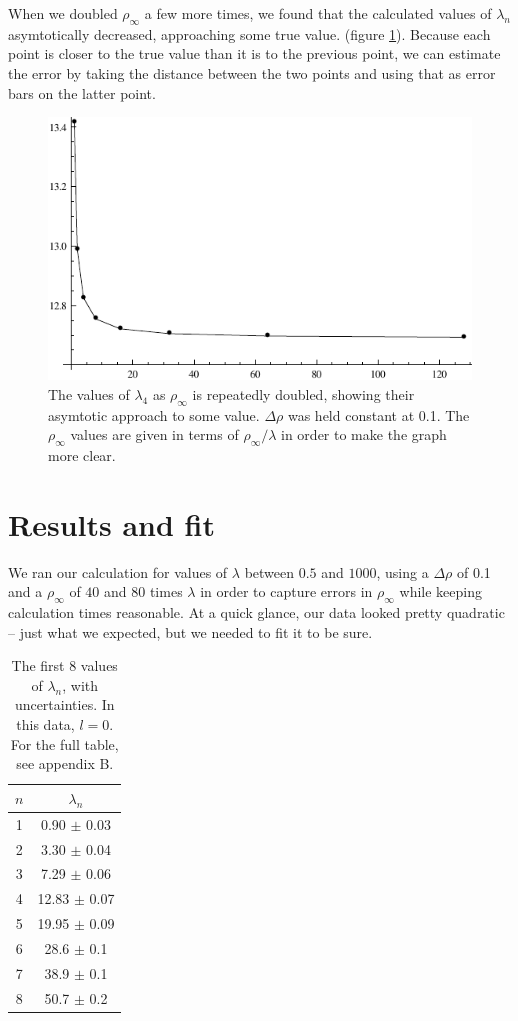 \documentclass[12pt,twoside]{reedthesis}
\begin{document}
When we doubled $\rho_{\infty}$ a few more times, we found that the calculated values of $\lambda_{n}$ asymtotically decreased, approaching some true value. (figure \ref{fig:asymtote}). Because each point is closer to the true value than it is to the previous point, we can estimate the error by taking the distance between the two points and using that as error bars on the latter point.

\begin{figure}[h]
\centering
\includegraphics{Figures/asymtote}
\caption[Asymtotic behavior of $\lambda_{4} (\rho_{\infty})$]{The values of $\lambda_{4}$ as $\rho_{\infty}$ is repeatedly doubled, showing their asymtotic approach to some value. $\Delta \rho$ was held constant at 0.1. The $\rho_{\infty}$ values are given in terms of $\rho_{\infty}/\lambda$ in order to make the graph more clear.}
\label{fig:asymtote}
\end{figure} 

\section{Results and fit}
We ran our calculation for values of $\lambda$ between $0.5$ and $1000$, using a $\Delta \rho$ of 0.1 and a $\rho_{\infty}$ of $40$ and $80$ times $\lambda$ in order to capture errors in $\rho_{\infty}$ while keeping calculation times reasonable. At a quick glance, our data looked pretty quadratic -- just what we expected, but we needed to fit it to be sure.

\begin{table}[h]
\centering
	\caption{The first 8 values of $\lambda_n$, with uncertainties. In this data, $l = 0$. For the full table, see appendix B.}
	\label{tab:l0short}
	\begin{tabular}{c|c}
		$n$	& $\lambda_n$	 \\
\hline
		1	& 0.90	$\pm$ 0.03\\
		2	& 3.30	$\pm$ 0.04\\
		3	& 7.29	$\pm$ 0.06\\
		4	& 12.83	$\pm$ 0.07\\
		5	& 19.95	$\pm$ 0.09\\
		6	& 28.6	$\pm$ 0.1\\
		7	& 38.9	$\pm$ 0.1\\
		8	& 50.7	$\pm$ 0.2
	\end{tabular}
\end{table}
\end{document}
